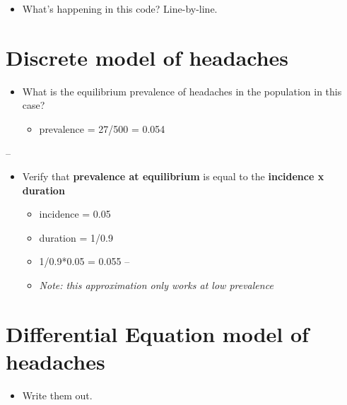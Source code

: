 \documentclass[]{article}
\providecommand{\tightlist}{%
  \setlength{\itemsep}{0pt}\setlength{\parskip}{0pt}}
\begin{document}
\begin{itemize}
\tightlist
\item
  What's happening in this code? Line-by-line.
\end{itemize}

\section{Discrete model of
headaches}\label{discrete-model-of-headaches-1}

\begin{itemize}
\tightlist
\item
  What is the equilibrium prevalence of headaches in the population in
  this case?

  \begin{itemize}
  \tightlist
  \item
    prevalence = 27/500 = 0.054
  \end{itemize}
\end{itemize}

--

\begin{itemize}
\item
  Verify that \textbf{prevalence at equilibrium} is equal to the
  \textbf{incidence x duration}

  \begin{itemize}
  \item
    incidence = 0.05
  \item
    duration = 1/0.9
  \item
    1/0.9*0.05 = 0.055 --
  \item
    \emph{Note: this approximation only works at low prevalence}
  \end{itemize}
\end{itemize}

\section{Differential Equation model of
headaches}\label{differential-equation-model-of-headaches}

\begin{itemize}
\tightlist
\item
  Write them out.
\end{itemize}
\end{document}
